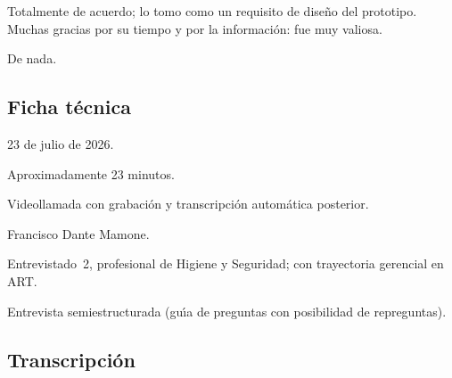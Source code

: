 \begin{description}[style=nextline, leftmargin=0cm, labelsep=0.35cm]
\item[\textbf{Entrevistador:}]
Totalmente de acuerdo; lo tomo como un requisito de dise\~no del prototipo.
Muchas gracias por su tiempo y por la informaci\'on: fue muy valiosa.

\item[\textbf{Entrevistado:}]
De nada.

\end{description}

\label{anexo:entrevista-diego-oviedo}

\subsection*{Ficha t\'ecnica}

\begin{description}[style=nextline, leftmargin=3.2cm, labelwidth=2.8cm]
	\item[Fecha] 23 de julio de 2026.
	\item[Duraci\'on] Aproximadamente 23 minutos.
	\item[Modalidad] Videollamada con grabaci\'on y transcripci\'on autom\'atica posterior.
	\item[Entrevistador] Francisco Dante Mamone.
	\item[Entrevistado] Entrevistado~2, profesional de Higiene y Seguridad; con trayectoria gerencial en ART.
	\item[Tipo] Entrevista semiestructurada (gu\'{\i}a de preguntas con posibilidad de repreguntas).
\end{description}

\subsection*{Transcripci\'on}

